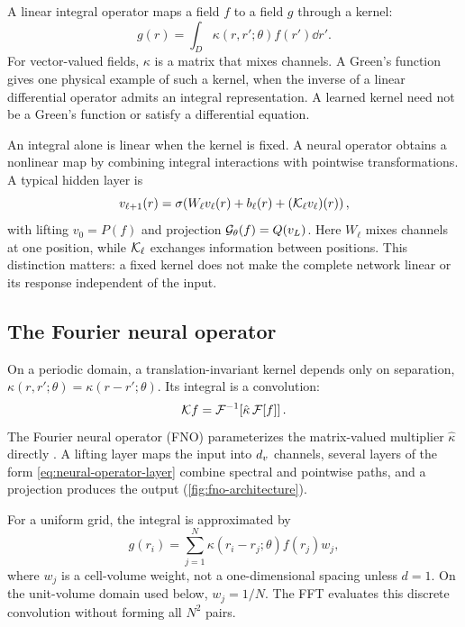 A linear integral operator maps a field $f$ to a field $g$ through a kernel:
\begin{equation}
  \label{eq:kernel-integral}
  g(r)=\int_D\kappa(r,r';\theta)f(r')\dd r'.
\end{equation}
For vector-valued fields, $\kappa$ is a matrix that mixes channels. A Green's function gives one physical example of such a kernel, when the inverse of a linear differential operator admits an integral representation. A learned kernel need not be a Green's function or satisfy a differential equation.

An integral alone is linear when the kernel is fixed. A neural operator obtains a nonlinear map by combining integral interactions with pointwise transformations. A typical hidden layer is
\begin{equation}
  \label{eq:neural-operator-layer}
  v_{\ell+1}(r)=\sigma\!\left(W_\ell v_\ell(r)+b_\ell(r)
           +(\mathcal{K}_\ell v_\ell)(r)\right),
\end{equation}
with lifting $v_0=P(f)$ and projection $\mathcal{G}_\theta(f)=Q(v_L)$. Here $W_\ell$ mixes channels at one position, while $\mathcal{K}_\ell$ exchanges information between positions. This distinction matters: a fixed kernel does not make the complete network linear or its response independent of the input.

\subsection{The Fourier neural operator}
\label{sec:fno}

On a periodic domain, a translation-invariant kernel depends only on separation, $\kappa(r,r';\theta)=\kappa(r-r';\theta)$. Its integral is a convolution:
\begin{equation}
  \label{eq:kernel-integral-fourier}
  \mathcal{K} f=\mathcal{F}^{-1}\!\left[\hat\kappa\,\mathcal{F}[f]\right].
\end{equation}
The Fourier neural operator (FNO) parameterizes the matrix-valued multiplier $\hat\kappa$ directly \citep{li2021fourier}. A lifting layer maps the input into $d_v$ channels, several layers of the form \cref{eq:neural-operator-layer} combine spectral and pointwise paths, and a projection produces the output (\cref{fig:fno-architecture}).

For a uniform grid, the integral is approximated by
\begin{equation}
  \label{eq:kernel-integral-discrete}
  g(r_i)=\sum_{j=1}^{N}\kappa(r_i-r_j;\theta)f(r_j)w_j,
\end{equation}
where $w_j$ is a cell-volume weight, not a one-dimensional spacing unless $d=1$. On the unit-volume domain used below, $w_j=1/N$. The FFT evaluates this discrete convolution without forming all $N^2$ pairs.

